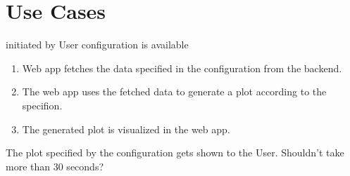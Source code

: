 \section{Use Cases}

{initiated by User}
{configuration is available}
{\begin{enumerate}
    \item Web app fetches the data specified in the configuration from the backend.
    \item The web app uses the fetched data to generate a plot according to the specifion.
    \item The generated plot is visualized in the web app.
\end{enumerate}}
{The plot specified by the configuration gets shown to the User.}
{Shouldn't take more than 30 seconds?}
